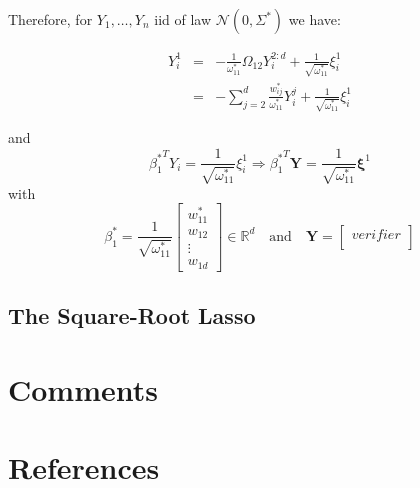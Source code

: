 \documentclass[12pt]{article}
\let\bb\mathbb       %
\def\RR{{\bb R}}\def\ZZ{{\bb Z}}\def\FF{{\bb F}}\def\DD{{\bb D}}
\def\bb{\mathbb}
\def\bY{\boldsymbol Y}
\def\bxi{\boldsymbol \xi}
\begin{document}
Therefore, for $Y_1,\dots,Y_n$ iid of law $\mathcal N(0,\Sigma^*)$ we have:

\begin{equation}
\begin{array}{lcl}
  Y_i^1&=&-\frac{1}{\omega_{11}^*}\Omega_{12}Y_i^{2:d}+\frac{1}{\sqrt{\omega_{11}^*}}\xi^1_i\\
  &=&-\sum_{j=2}^{d}\frac{w_{ij}^*}{\omega_{11}^*}Y_i^j+\frac{1}{\sqrt{\omega_{11}^*}}\xi^1_i
\end{array}
\end{equation}

and
\begin{equation}
{\beta_1^*}^TY_i=\frac{1}{\sqrt{\omega_{11}^*}}\xi^1_i
\Rightarrow
{\beta_1^*}^T\bY=\frac{1}{\sqrt{\omega_{11}^*}}\bxi^1
\end{equation}
with
\begin{equation}
\beta_1^*=\frac{1}{\sqrt{\omega_{11}^*}}
  \begin{bmatrix}
  w_{11}^*\\
  w_{12}\\
  \vdots\\
  w_{1d}
  \end{bmatrix}
  \in \RR^d
  \quad \text{and}\quad \bY= \begin{bmatrix}
  verifier\\
  \end{bmatrix}
\end{equation}


\subsection{The Square-Root Lasso}

\section{Comments}
\section{References}
\end{document}
